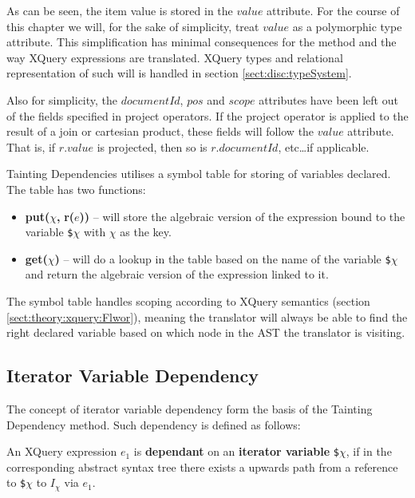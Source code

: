 As can be seen, the item value is stored in the $value$ attribute. For the course of this chapter we will, for the
sake of simplicity, treat $value$ as a polymorphic type attribute. This simplification has minimal consequences
for the method and the way XQuery expressions are translated. XQuery types and relational representation of such
will is handled in section \ref{sect:disc:typeSystem}. 

Also for simplicity, the $documentId$, $pos$ and $scope$ attributes have been left out of the
fields specified in \textsf{project} operators. If the \textsf{project} operator is applied to the result of a
join or cartesian product, these fields will follow the $value$ attribute. That is, if $r.value$ is projected,
then so is $r.documentId$, etc\ldots if applicable.

Tainting Dependencies utilises a symbol table for storing of variables declared. The table has two functions:
\begin{itemize}
  \item \textbf{put(}$\chi$\textbf{, }\textbf{r(}$e$\textbf{))} -- will store the
  algebraic version of the expression bound to the variable \texttt{\$}$\chi$ with $\chi$ as the key.  
  \item \textbf{get(}$\chi$\textbf{)} -- will do a lookup in the table based on the name of the variable
  \texttt{\$}$\chi$ and return the algebraic version of the expression linked to it.
\end{itemize}
The symbol table handles scoping according to XQuery semantics (section \ref{sect:theory:xquery:Flwor}), meaning
the translator will always be able to find the right declared variable based on which node in the AST the
translator is visiting.

\subsection{Iterator Variable Dependency}
\label{sect:trans:TD:dependency}

The concept of iterator variable dependency form the basis of the Tainting Dependency method. Such dependency is
defined as follows:

\noindent
\begin{myDefinition}
An XQuery expression $e_{1}$ is \textbf{dependant} on an \textbf{iterator variable} \texttt{\$}$\chi$, if in the
corresponding abstract syntax tree there exists a upwards path from a reference to \texttt{\$}$\chi$ to $I_{\chi}$
via $e_{1}$.
\label{def:iterVarDep}
\end{myDefinition}

